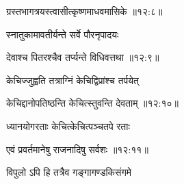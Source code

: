 
{\devanagarifont ग्रस्तभागत्रयस्त्वासीत्कृष्णमाधवमासिके {॥१२:८॥} \veg\dontdisplaylinenum }%
 
{\devanagarifont स्नातुकामावतीर्यन्ते सर्वे पौरनृपादयः \thinspace{\dandab} \dontdisplaylinenum }%


{\devanagarifont देवाश्च पितरश्चैव तर्प्यन्ते विधिवत्तथा {॥१२:९॥} \veg\dontdisplaylinenum }%

{\devanagarifont केचिज्जुह्वति तत्राग्निं केचिद्विप्रांश्च तर्पयेत् \thinspace{\dandab} \dontdisplaylinenum }%


{\devanagarifont केचिद्दानोपतिष्ठन्ति केचित्स्तुवन्ति देवताम् {॥१२:१०॥} \veg\dontdisplaylinenum }%

{\devanagarifont ध्यानयोगरताः केचित्केचित्पञ्चतपे रताः \thinspace{\dandab} \dontdisplaylinenum }%


{\devanagarifont एवं प्रवर्तमानेषु राजनादिषु सर्वशः {॥१२:११॥} \veg\dontdisplaylinenum }%

{\devanagarifont विपुलो ऽपि हि तत्रैव गङ्गागण्डकिसंगमे \thinspace{\dandab} \dontdisplaylinenum }%



